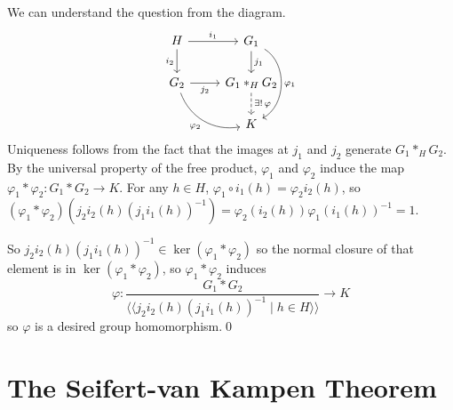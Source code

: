 \documentclass{article}
\begin{document}
\pf We can understand the question from the diagram.
\[
  \begin{tikzcd}
H \arrow[r, "i_1"] \arrow[d, "i_2"'] & G_1 \arrow[d, "j_1"] \arrow[dd, bend left=60, "\varphi_1"] \\
G_2 \arrow[r, "j_2"'] \arrow[dr, bend right=40, "\varphi_2"'] & G_1 *_H G_2 \arrow[d, dashed, "\exists!\, \varphi"] \\
& K
\end{tikzcd}
\]
Uniqueness follows from the fact that the images at $ j_1 $ and $ j_2 $ generate $ G_1 *_H G_2 $. By the universal property of the free product, $ \varphi_1 $ and $ \varphi_2 $ induce the map $ \varphi_1 * \varphi_2: G_1 * G_2 \to K $. For any $ h\in H $, $ \varphi_1\circ i_1(h) = \varphi_2 i_2(h) $, so $ (\varphi_1 * \varphi_2)(j_2i_2(h)(j_1i_1(h))^{-1}) = \varphi_2(i_2(h))\varphi_1(i_1(h))^{-1} = 1 $. \par
So $ j_2i_2(h)(j_1i_1(h))^{-1}\in \ker(\varphi_1*\varphi_2) $ so the normal closure of that element is in $ \ker(\varphi_1*\varphi_2) $, so $ \varphi_1 * \varphi_2 $ induces 
\[
	\varphi: \frac{G_1 * G_2}{\langle\langle j_2i_2(h)(j_1i_1(h))^{-1}\mid h\in H\rangle\rangle} \to K
\]
so $ \varphi $ is a desired group homomorphism.\qed
\section{The Seifert-van Kampen Theorem}
\end{document}
